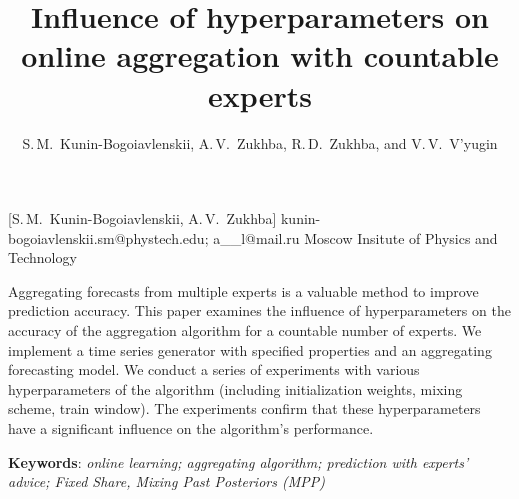 \documentclass[12pt, twoside]{article}
\begin{document}
\English

\title
    [] %
    {Influence of hyperparameters on online aggregation with countable experts} %
\author
    [S.\,M.~Kunin-Bogoiavlenskii] %
    {S.\,M.~Kunin-Bogoiavlenskii, A.\,V.~Zukhba, R.\,D.~Zukhba, and V.\,V.~V’yugin} %
    [S.\,M.~Kunin-Bogoiavlenskii, A.\,V.~Zukhba] %
\email
    {kunin-bogoiavlenskii.sm@phystech.edu; a\_\_l@mail.ru}
\organization
    {Moscow Insitute of Physics and Technology}
\abstract
    {

    Aggregating forecasts from multiple experts is a valuable method to improve prediction accuracy.
    This paper examines the influence of hyperparameters on the accuracy of the aggregation algorithm for a countable number of experts.
    We implement a time series generator with specified properties and an aggregating forecasting model. 
    We conduct a series of experiments with various hyperparameters of the algorithm (including initialization weights, mixing scheme, train window). 
    The experiments confirm that these hyperparameters have a significant influence on the algorithm's performance.           
        
%   
%   
%   
%               
    \noindent
        \textbf{Keywords}: \emph{online learning; aggregating algorithm; prediction with experts’ advice; Fixed Share, Mixing Past Posteriors (MPP)}}

\end{document}
